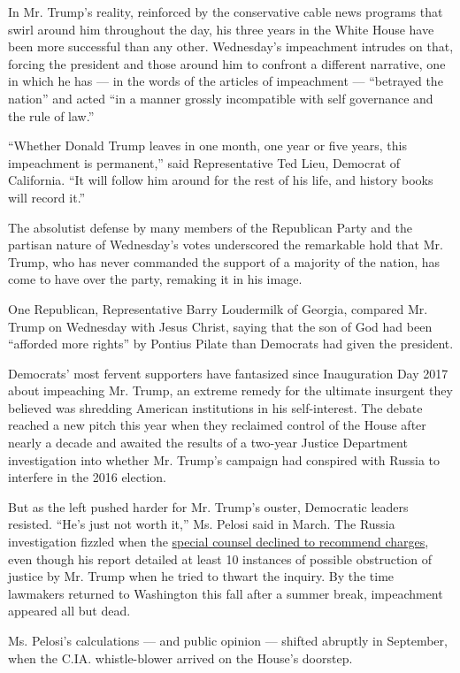In Mr. Trump's reality, reinforced by the conservative cable news
programs that swirl around him throughout the day, his three years in
the White House have been more successful than any other. Wednesday's
impeachment intrudes on that, forcing the president and those around him
to confront a different narrative, one in which he has --- in the words
of the articles of impeachment --- ``betrayed the nation'' and acted
``in a manner grossly incompatible with self governance and the rule of
law.''

``Whether Donald Trump leaves in one month, one year or five years, this
impeachment is permanent,'' said Representative Ted Lieu, Democrat of
California. ``It will follow him around for the rest of his life, and
history books will record it.''

The absolutist defense by many members of the Republican Party and the
partisan nature of Wednesday's votes underscored the remarkable hold
that Mr. Trump, who has never commanded the support of a majority of the
nation, has come to have over the party, remaking it in his image.

One Republican, Representative Barry Loudermilk of Georgia, compared Mr.
Trump on Wednesday with Jesus Christ, saying that the son of God had
been ``afforded more rights'' by Pontius Pilate than Democrats had given
the president.

Democrats' most fervent supporters have fantasized since Inauguration
Day 2017 about impeaching Mr. Trump, an extreme remedy for the ultimate
insurgent they believed was shredding American institutions in his
self-interest. The debate reached a new pitch this year when they
reclaimed control of the House after nearly a decade and awaited the
results of a two-year Justice Department investigation into whether Mr.
Trump's campaign had conspired with Russia to interfere in the 2016
election.

But as the left pushed harder for Mr. Trump's ouster, Democratic leaders
resisted. ``He's just not worth it,'' Ms. Pelosi said in March. The
Russia investigation fizzled when the
\href{https://www.nytimes.com/2019/05/29/us/politics/mueller-special-counsel.html}{special
counsel declined to recommend charges}, even though his report detailed
at least 10 instances of possible obstruction of justice by Mr. Trump
when he tried to thwart the inquiry. By the time lawmakers returned to
Washington this fall after a summer break, impeachment appeared all but
dead.

Ms. Pelosi's calculations --- and public opinion --- shifted abruptly in
September, when the C.IA. whistle-blower arrived on the House's
doorstep.

